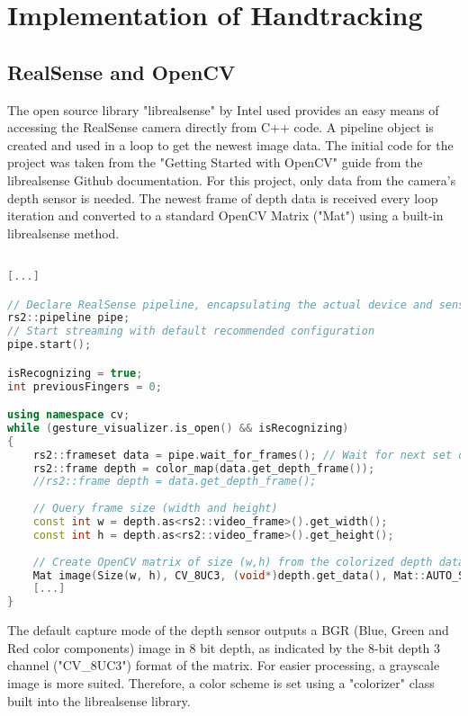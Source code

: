 \documentclass[BSA,Bachelor,english]{twbook}%
\begin{document}
\section{Implementation of Handtracking}
\subsection{RealSense and OpenCV}
The open source library "librealsense"\cite{REALSENSE} by Intel used provides an easy means of accessing the RealSense camera directly from C++ code. A pipeline object is created and used in a loop to get the newest image data. The initial code for the project was taken from the "Getting Started with OpenCV" guide\cite{RS_GUIDE} from the librealsense Github documentation. For this project, only data from the camera's depth sensor is needed. The newest frame of depth data is received every loop iteration and converted to a standard OpenCV Matrix ("Mat") using a built-in librealsense method.

\begin{lstlisting}[language=C++,name={RealSense image capture and conversion},label={rs:loop:1}]

[...]

// Declare RealSense pipeline, encapsulating the actual device and sensors
rs2::pipeline pipe;
// Start streaming with default recommended configuration
pipe.start();

isRecognizing = true;
int previousFingers = 0;

using namespace cv;
while (gesture_visualizer.is_open() && isRecognizing)
{
	rs2::frameset data = pipe.wait_for_frames(); // Wait for next set of frames from the camera
	rs2::frame depth = color_map(data.get_depth_frame());
	//rs2::frame depth = data.get_depth_frame();
	
	// Query frame size (width and height)
	const int w = depth.as<rs2::video_frame>().get_width();
	const int h = depth.as<rs2::video_frame>().get_height();
	
	// Create OpenCV matrix of size (w,h) from the colorized depth data
	Mat image(Size(w, h), CV_8UC3, (void*)depth.get_data(), Mat::AUTO_STEP);
	[...]    
}
\end{lstlisting}

\newpage
The default capture mode of the depth sensor outputs a BGR (Blue, Green and Red color components) image in 8 bit depth, as indicated by the 8-bit depth 3 channel ("CV\_8UC3") format of the matrix. For easier processing, a grayscale image is more suited. Therefore, a color scheme is set using a "colorizer" class built into the librealsense library.
\end{document}
